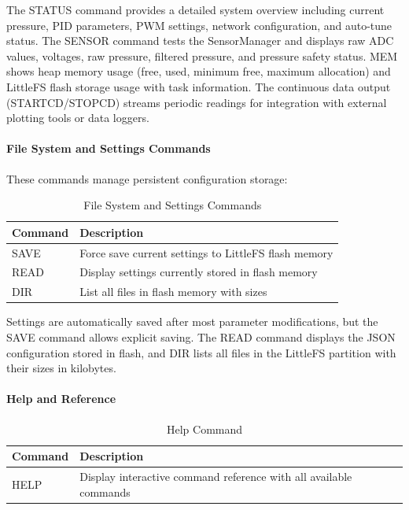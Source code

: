 \documentclass[12pt,a4paper]{article}
\begin{document}
The STATUS command provides a detailed system overview including current pressure, PID parameters, PWM settings, network configuration, and auto-tune status. The SENSOR command tests the SensorManager and displays raw ADC values, voltages, raw pressure, filtered pressure, and pressure safety status. MEM shows heap memory usage (free, used, minimum free, maximum allocation) and LittleFS flash storage usage with task information. The continuous data output (STARTCD/STOPCD) streams periodic readings for integration with external plotting tools or data loggers.

\paragraph{File System and Settings Commands}
These commands manage persistent configuration storage:

\begin{table}[H]
\centering
\begin{tabular}{@{}ll@{}}
\toprule
\textbf{Command} & \textbf{Description} \\
\midrule
SAVE & Force save current settings to LittleFS flash memory \\
READ & Display settings currently stored in flash memory \\
DIR & List all files in flash memory with sizes \\
\bottomrule
\end{tabular}
\caption{File System and Settings Commands}
\end{table}

Settings are automatically saved after most parameter modifications, but the SAVE command allows explicit saving. The READ command displays the JSON configuration stored in flash, and DIR lists all files in the LittleFS partition with their sizes in kilobytes.

\paragraph{Help and Reference}
\begin{table}[H]
\centering
\begin{tabular}{@{}ll@{}}
\toprule
\textbf{Command} & \textbf{Description} \\
\midrule
HELP & Display interactive command reference with all available commands \\
\bottomrule
\end{tabular}
\caption{Help Command}
\end{table}
\end{document}
